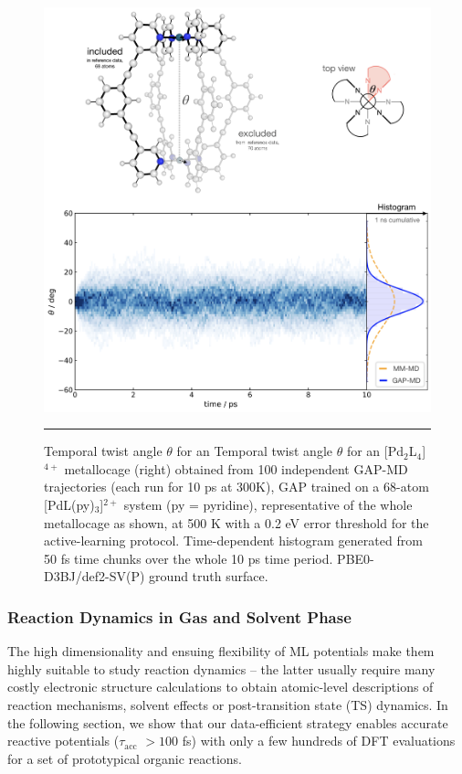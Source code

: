 \documentclass[../../main.tex]{subfiles}
\newcommand{\taua}{$\tau_\text{acc}$ }
\begin{document}
\begin{figure}[h!]
	\vspace{0.4cm}
	\centering
	\includegraphics[width=14cm]{6/gap/figs_ms/fig4}
	\vspace{0.2cm}
	\hrule
	\caption{Temporal twist angle $\theta$ for an Temporal twist angle $\theta$ for an [Pd${}_2$L${}_4$]$^{4+}$ metallocage (right) obtained from 100 independent GAP-MD trajectories (each run for 10 ps at 300K), GAP trained on a 68-atom [PdL(py)${}_3$]$^{2+}$ system (py = pyridine), representative of the whole metallocage as shown, at 500 K with a 0.2 eV error threshold for the active-learning protocol. Time-dependent histogram generated from 50 fs time chunks over the whole 10 ps time period. PBE0-D3BJ/def2-SV(P) ground truth surface.}
	\label{fig::ml_4}
\end{figure}


\subsubsection{Reaction Dynamics in Gas and Solvent Phase}

The high dimensionality and ensuing flexibility of ML potentials make them highly suitable to study reaction dynamics – the latter usually require many costly electronic structure calculations to obtain atomic-level descriptions of reaction mechanisms, solvent effects or post-transition state (TS) dynamics.\cite{Pratihar2017, Ess2008} In the following section, we show that our data-efficient strategy enables accurate reactive potentials (\taua $> 100$ fs) with only a few hundreds of DFT evaluations for a set of prototypical organic reactions.
\end{document}
